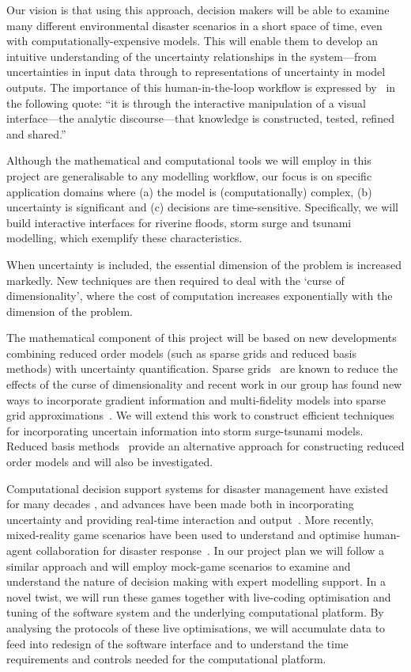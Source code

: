 Our vision is that using this approach, decision makers will be able
to examine many different environmental disaster scenarios in a short
space of time, even with computationally-expensive models. This will
enable them to develop an intuitive understanding of the uncertainty
relationships in the system---from uncertainties in input data through
to representations of uncertainty in model outputs. The importance of
this human-in-the-loop workflow is expressed by~\cite{pikeScience2009}
in the following quote: ``it is through the interactive manipulation
of a visual interface---the analytic discourse---that knowledge is
constructed, tested, refined and shared.''

Although the mathematical and computational tools we will employ in
this project are generalisable to any modelling workflow, our focus is
on specific application domains where (a) the model is
(computationally) complex, (b) uncertainty is significant and (c)
decisions are time-sensitive. Specifically, we will build interactive
interfaces for riverine floods, storm surge and tsunami modelling,
which exemplify these characteristics.

When uncertainty is included, the 
essential dimension of the problem is increased markedly.  
New techniques are then required to deal with the
`curse of dimensionality', where
the cost of computation increases exponentially with the dimension of
the problem. 

The mathematical component of this project will be based on new
developments combining reduced order models 
(such as sparse grids and reduced basis methods)
with uncertainty quantification.
Sparse grids~\parencite{BungartzGriebel2004} are known to
reduce the effects of the curse of dimensionality and 
recent work in our group has found new ways to incorporate gradient
information and multi-fidelity models into sparse grid
approximations~\parencite{deBaarHarding2015,Jakeman2015,deBaarRDM2015}.
We will extend this work to construct efficient techniques 
for incorporating uncertain  information into 
storm surge-tsunami models. 
Reduced basis 
methods~\parencite{quarteroni2015reduced} provide an 
alternative approach for constructing reduced order 
models and will also be investigated.

Computational decision support systems for disaster management have
existed for many decades \parencite{wallaceDecision1985}, and
advances have been made both in incorporating
uncertainty \parencite{thompsonSocial2014,nealeNavigating2015}
and providing real-time interaction and
output~\parencite{yuSupport2006}. More recently, mixed-reality game
scenarios have been used to understand and optimise human-agent
collaboration for disaster response~\parencite{ramchurn2016human}. In
our project plan we will follow a similar approach and will employ
mock-game scenarios to examine and understand the nature of decision
making with expert modelling support. In a novel twist, we will run
these games together with live-coding optimisation and tuning of the
software system and the underlying computational platform. By
analysing the protocols of these live optimisations, we will
accumulate data to feed into redesign of the software interface and to
understand the time requirements and controls needed for the
computational platform.

